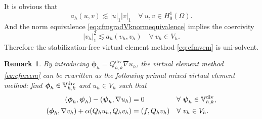 \documentclass[10pt]{amsart}
\newtheorem{theorem}{Theorem}[section]
\newtheorem{lemma}[theorem]{Lemma}
\newtheorem{remark}[theorem]{Remark}
\renewcommand{\div}{\operatorname{div}}
\numberwithin{equation}{section}
\begin{document}
It is obvious that 
\begin{equation}\label{eq:cfmahbounedness}
a_h(u, v)\lesssim |u|_1|v|_1\quad\forall~u,v\in H_0^1(\Omega).
\end{equation}  
And the norm equivalence \eqref{eq:cfmgradVknormequivalence} implies
the coercivity
\begin{equation}\label{eq:cfmahcoercivity}
|v_h|_1^2\lesssim a_h(v_h, v_h)\quad\forall~v_h\in V_h.
\end{equation}  
Therefore the stabilization-free virtual element method \eqref{eq:cfmvem} is uni-solvent.

\begin{remark}\rm
By introducing $\boldsymbol{\phi}_h=Q_{h,k}^{\div}\nabla u_h$, the virtual element method \eqref{eq:cfmvem} can be rewritten as the following primal mixed virtual element method: find $\boldsymbol{\phi}_h\in\mathbb{V}_{h,k}^{\rm div}$ and $u_h\in V_h$ such that
\begin{equation*}
\begin{aligned}
(\boldsymbol{\phi}_h, \boldsymbol{\psi}_h) - (\boldsymbol{\psi}_h, \nabla u_h)&=0 \quad\quad\quad\quad\;\;\forall~\boldsymbol{\psi}_h\in\mathbb{V}_{h,k}^{\rm div},\\
(\boldsymbol{\phi}_h, \nabla v_h)+\alpha(Q_hu_h, Q_hv_h)&=(f, Q_hv_h)\quad\forall~v_h\in V_h.
\end{aligned}
\end{equation*}
\end{remark}



\end{document}
